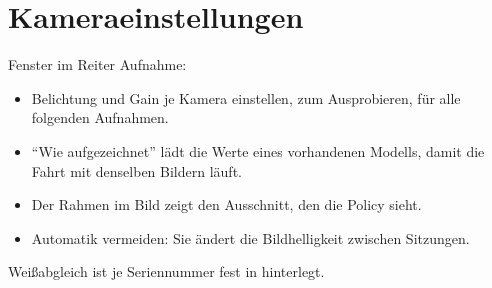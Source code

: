 \section{Kameraeinstellungen}
\label{sec:kamera-einst}

Fenster  im Reiter Aufnahme:
\begin{itemize}
  \item Belichtung und Gain je Kamera einstellen,  zum Ausprobieren,
     für alle folgenden Aufnahmen.
  \item \enquote{Wie aufgezeichnet} lädt die Werte eines vorhandenen Modells, damit die Fahrt
    mit denselben Bildern läuft.
  \item Der Rahmen im Bild zeigt den Ausschnitt, den die Policy sieht.
  \item Automatik vermeiden: Sie ändert die Bildhelligkeit zwischen Sitzungen.
\end{itemize}
Weißabgleich ist je Seriennummer fest in  hinterlegt.

